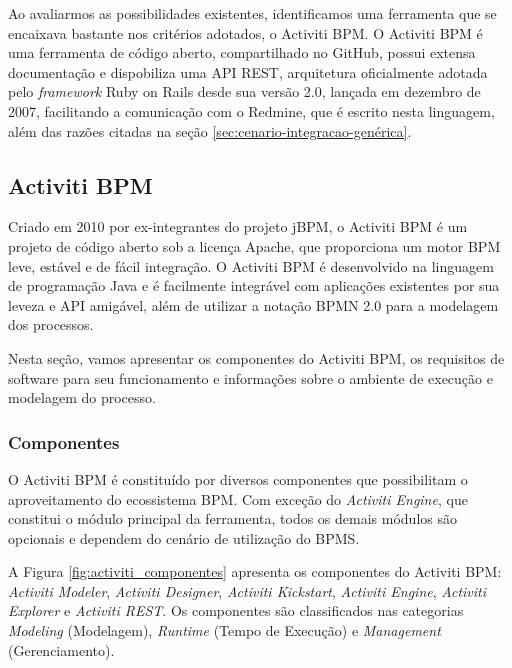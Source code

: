Ao avaliarmos as possibilidades existentes, identificamos uma ferramenta que se encaixava bastante nos critérios adotados, o Activiti BPM. O Activiti BPM é uma ferramenta de código aberto, compartilhado no GitHub\cite{activiti_github}, possui extensa documentação\cite{activiti-userguide} e dispobiliza uma API REST, arquitetura oficialmente adotada pelo \textit{framework} Ruby on Rails desde sua versão 2.0, lançada em dezembro de 2007\cite{rails_rest_support}, facilitando a comunicação com o Redmine, que é escrito nesta linguagem, além das razões citadas na seção \ref{sec:cenario-integracao-genérica}.

\subsection{Activiti BPM}\label{sec:activiti}
Criado em 2010 por ex-integrantes do projeto jBPM\cite{bpm_jbpm}, o Activiti BPM\cite{bpm_activiti} é um projeto de código aberto sob a licença Apache\cite{apache_license}, que proporciona um motor BPM leve, estável e de fácil integração. O Activiti BPM é desenvolvido na linguagem de programação Java\cite{java-history} e é facilmente integrável com aplicações existentes por sua leveza e API\cite{api} amigável, além de utilizar a notação BPMN 2.0 para a modelagem dos processos.

Nesta seção, vamos apresentar os componentes do Activiti BPM, os requisitos de software para seu funcionamento e informações sobre o ambiente de execução e modelagem do processo.

\subsubsection{Componentes}\label{sec:automatizacao_processos-gestao_processos}

O Activiti BPM é constituído por diversos componentes que possibilitam o aproveitamento do ecossistema BPM. Com exceção do \textit{Activiti Engine}, que constitui o módulo principal da ferramenta, todos os demais módulos são opcionais e dependem do cenário de utilização do BPMS.

A Figura \ref{fig:activiti_componentes} apresenta os componentes do Activiti BPM: \textit{Activiti Modeler}, \textit{Activiti Designer}, \textit{Activiti Kickstart}, \textit{Activiti Engine}, \textit{Activiti Explorer} e \textit{Activiti REST}. Os componentes são classificados nas categorias \textit{Modeling} (Modelagem), \textit{Runtime} (Tempo de Execução) e \textit{Management} (Gerenciamento).

